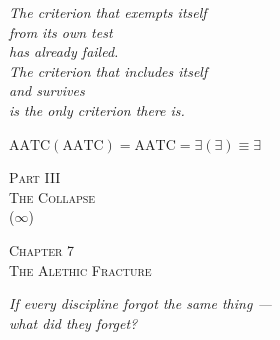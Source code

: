 \documentclass[10pt, openany, oneside]{book}
\renewcommand{\normalsize}{\fontsize{10}{13}\selectfont}
\renewcommand{\large}{\fontsize{11.5}{14}\selectfont}
\renewcommand{\LARGE}{\fontsize{15}{18}\selectfont}
\renewcommand{\huge}{\fontsize{17}{21}\selectfont}
\begin{document}
\vspace{0.5em}

\begin{center}
    \itshape
    The criterion that exempts itself\\
    from its own test\\
    has already failed.\\[0.8em]
    The criterion that includes itself\\
    and survives\\
    is the only criterion there is.
\end{center}

\vspace{0.5em}

\begin{center}
    $\text{AATC}(\text{AATC}) = \text{AATC} = \exists(\exists) \equiv \exists$
\end{center}


%
%

\newpage
\thispagestyle{empty}
\vspace*{\fill}
\begin{center}
    {\LARGE\scshape Part III}\\[1em]
    {\large\scshape The Collapse}\\[0.5em]
    {\normalsize ($\infty$)}
\end{center}
\vspace*{\fill}
\newpage

%
%
%

\newpage

\begin{center}
    {\huge\scshape Chapter 7}\\[0.3em]
    {\large\scshape The Alethic Fracture}
\end{center}

\vspace{1.5em}

\begin{center}
    \itshape
    If every discipline forgot the same thing ---\\
    what did they forget?
\end{center}
\end{document}
